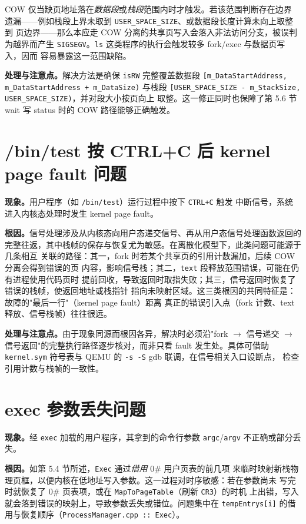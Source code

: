 COW 仅当缺页地址落在\emph{数据段}或\emph{栈段}范围内时才触发。若该范围判断存在边界
遗漏——例如栈段上界未取到 \texttt{USER\_SPACE\_SIZE}、或数据段长度计算未向上取整到
页边界——那么本应走 COW 分离的共享页写入会落入非法访问分支，被误判为越界而产生
\texttt{SIGSEGV}。\texttt{ls} 这类程序的执行会触发较多 fork/exec 与数据页写入，因而
容易暴露这一范围缺陷。

\textbf{处理与注意点。}解决方法是确保 \texttt{isRW} 完整覆盖数据段
\texttt{[m\_DataStartAddress, m\_DataStartAddress + m\_DataSize)} 与栈段
\texttt{[USER\_SPACE\_SIZE - m\_StackSize, USER\_SPACE\_SIZE)}，并对段大小按页向上
取整。这一修正同时也保障了第 5.6 节 wait 写 status 时的 COW 路径能够正确触发。

\section{/bin/test 按 CTRL+C 后 kernel page fault 问题}
\textbf{现象。}用户程序（如 \texttt{/bin/test}）运行过程中按下 \texttt{CTRL+C} 触发
中断信号，系统进入内核态处理时发生 kernel page fault。

\textbf{根因。}信号处理涉及从内核态向用户态递交信号、再从用户态信号处理函数返回的
完整往返，其中栈帧的保存与恢复尤为敏感。在离散化模型下，此类问题可能源于几条相互
关联的路径：其一，fork 时若某个共享页的引用计数漏加，后续 COW 分离会得到错误的页
内容，影响信号栈；其二，\texttt{text} 段释放范围错误，可能在仍有进程使用代码页时
提前回收，导致返回时取指失败；其三，信号返回时恢复了错误的栈帧，使返回地址或栈指针
指向未映射区域。这三类根因的共同特征是：故障的"最后一行"（kernel page fault）距离
真正的错误引入点（fork 计数、text 释放、信号栈帧）往往很远。

\textbf{处理与注意点。}由于现象同源而根因各异，解决时必须沿"fork $\to$ 信号递交
$\to$ 信号返回"的完整执行路径逐步核对，而非只看 fault 发生处。具体可借助
\texttt{kernel.sym} 符号表与 QEMU 的 \texttt{-s -S} gdb 联调，在信号相关入口设断点，
检查引用计数与栈帧的一致性。

\section{exec 参数丢失问题}
\textbf{现象。}经 \texttt{exec} 加载的用户程序，其拿到的命令行参数
\texttt{argc}/\texttt{argv} 不正确或部分丢失。

\textbf{根因。}如第 5.4 节所述，\texttt{Exec} 通过\emph{借用} 0\# 用户页表的前几项
来临时映射新栈物理页框，以便内核在低地址写入参数。这一过程对时序敏感：若在参数尚未
写完时就恢复了 0\# 页表项，或在 \texttt{MapToPageTable}（刷新 \texttt{CR3}）的时机
上出错，写入就会落到错误的映射上，导致参数丢失或错位。问题集中在
\texttt{tempEntrys[i]} 的借用与恢复顺序（\texttt{ProcessManager.cpp :: Exec}）。

